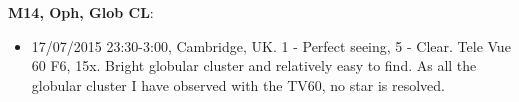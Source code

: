 {\bf M14, Oph, Glob CL}:
\begin{itemize}
\item 17/07/2015 23:30-3:00, Cambridge, UK. 1 - Perfect seeing, 5 - Clear. Tele Vue 60 F6, 15x. Bright globular cluster and relatively easy to find. As all the globular cluster I have observed with the TV60, no star is resolved.
\end{itemize}
